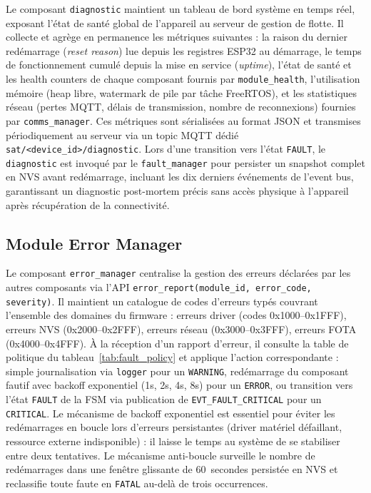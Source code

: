 Le composant \texttt{diagnostic} maintient un tableau de bord système
en temps réel, exposant l'état de santé global de l'appareil au
serveur de gestion de flotte. Il collecte et agrège en permanence
les métriques suivantes : la raison du dernier redémarrage
(\textit{reset reason}) lue depuis les registres ESP32 au démarrage,
le temps de fonctionnement cumulé depuis la mise en service
(\textit{uptime}), l'état de santé et les health counters de chaque
composant fournis par \texttt{module\_health}, l'utilisation mémoire
(heap libre, watermark de pile par tâche FreeRTOS), et les
statistiques réseau (pertes MQTT, délais de transmission, nombre de
reconnexions) fournies par \texttt{comms\_manager}. Ces métriques
sont sérialisées au format JSON et transmises périodiquement au
serveur via un topic MQTT dédié \texttt{sat/<device\_id>/diagnostic}.
Lors d'une transition vers l'état \texttt{FAULT}, le \texttt{diagnostic}
est invoqué par le \texttt{fault\_manager} pour persister un snapshot
complet en NVS avant redémarrage, incluant les dix derniers événements
de l'event bus, garantissant un diagnostic post-mortem précis sans
accès physique à l'appareil après récupération de la connectivité.

\subsection{Module Error Manager}
\label{subsec:mod_error}

Le composant \texttt{error\_manager} centralise la gestion des erreurs
déclarées par les autres composants via l'API
\texttt{error\_report(module\_id, error\_code, severity)}. Il maintient
un catalogue de codes d'erreurs typés couvrant l'ensemble des domaines
du firmware : erreurs driver (codes 0x1000--0x1FFF), erreurs NVS
(0x2000--0x2FFF), erreurs réseau (0x3000--0x3FFF), erreurs FOTA
(0x4000--0x4FFF). À la réception d'un rapport d'erreur, il consulte
la table de politique du tableau~\ref{tab:fault_policy} et applique
l'action correspondante : simple journalisation via \texttt{logger}
pour un \texttt{WARNING}, redémarrage du composant fautif avec backoff
exponentiel (1s, 2s, 4s, 8s) pour un \texttt{ERROR}, ou transition
vers l'état \texttt{FAULT} de la FSM via publication de
\texttt{EVT\_FAULT\_CRITICAL} pour un \texttt{CRITICAL}. Le mécanisme
de backoff exponentiel est essentiel pour éviter les redémarrages en
boucle lors d'erreurs persistantes (driver matériel défaillant,
ressource externe indisponible) : il laisse le temps au système de
se stabiliser entre deux tentatives. Le mécanisme anti-boucle
surveille le nombre de redémarrages dans une fenêtre glissante de
60~secondes persistée en NVS et reclassifie toute faute en
\texttt{FATAL} au-delà de trois occurrences.

